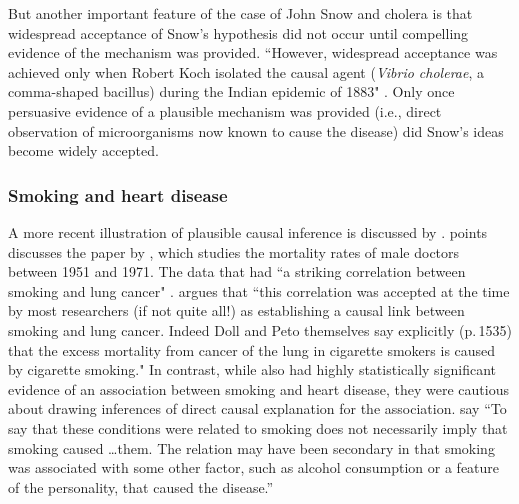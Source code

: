 \documentclass[11pt,reqno]{amsart}
\begin{document}
\begin{doublespace}
But another important feature of the case of John Snow and cholera is that widespread acceptance of Snow's hypothesis did not occur until compelling evidence of the mechanism was provided.
``However, widespread acceptance was achieved only when Robert Koch isolated the causal agent (\emph{Vibrio cholerae}, a comma-shaped bacillus) during the Indian epidemic of 1883"  \citep[p.\,342]{Freedman:2009ur}.
Only once persuasive evidence of a plausible mechanism was provided (i.e., direct observation of microorganisms now known to cause the disease) did Snow's ideas become widely accepted.

\subsubsection{Smoking and heart disease}
A more recent illustration of plausible causal inference is discussed by \citet{Gillies2011-GILTRT-3}.
 \citet{Gillies2011-GILTRT-3} points discusses the paper by \citet{Doll:1976aa}, which studies the mortality rates of male doctors between 1951 and 1971.
 The data that \citet{Doll:1976aa} had ``a striking correlation between smoking and lung cancer" \citep[p.\,111]{Gillies2011-GILTRT-3}.
 \citet{Gillies2011-GILTRT-3} argues that ``this correlation was accepted at the time by most researchers (if not quite all!) as establishing a causal link between smoking and lung cancer. Indeed Doll and Peto themselves say explicitly (p.\,1535) that the excess mortality from cancer of the lung in cigarette smokers is caused by cigarette smoking."
In contrast, while \citet{Doll:1976aa} also had highly statistically significant evidence of an association between smoking and heart disease, they were cautious about drawing inferences of direct causal explanation for the association.
\citet[p.\,1528]{Doll:1976aa} say ``To say that these conditions were related to smoking does not necessarily imply that smoking caused \dots them. The relation may have been secondary in that smoking was associated with some other factor, such as alcohol consumption or a feature of the personality, that caused the disease.''
 

\end{doublespace}
\end{document}

